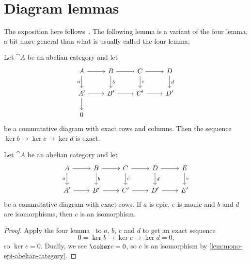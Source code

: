 \section{Diagram lemmas}
\noindent
The exposition here follows~\cite{IversenCohomologyOfSheaves}.
The following lemma is a variant of the four lemma, a bit more general than what is usually called the four lemma:
\begin{lem}\label{lem:four-lemma}
Let \(\cat A\) be an abelian category and let
\begin{equation*}
  \begin{tikzcd}
    A \ar[r] \ar[d, "a"'] & B \ar[r] \ar[d, "b"] & C \ar[r] \ar[d, "c"] & D \ar[d, "d"] \\
    A' \ar[r] \ar[d] & B' \ar[r] & C' \ar[r] & D' \\
    0
  \end{tikzcd}
\end{equation*}
be a commutative diagram with exact rows and columns.
Then the sequence \(\ker b\to\ker c\to\ker d\) is exact.
\end{lem}

\begin{cor}\label{lem:five-lemma}
Let \(\cat A\) be an abelian category and let
\begin{equation*}
  \begin{tikzcd}
    A \ar[r] \ar[d, "a"'] & B \ar[r] \ar[d, "b"] & C \ar[r] \ar[d, "c"] & D \ar[r] \ar[d, "d"] & E \ar[d, "e"] \\
    A' \ar[r] & B' \ar[r] & C' \ar[r] & D' \ar[r] & E'
  \end{tikzcd}
\end{equation*}
be a commutative diagram with exact rows.
If \(a\) is epic, \(e\) is monic and \(b\) and \(d\) are isomorphisms, then \(c\) is an isomorphism.
\end{cor}
\begin{proof}
Apply the four lemma~ to \(a\), \(b\), \(c\) and \(d\) to get an exact sequence
\[0=\ker b\to\ker c\to\ker d=0\text{,} \] so \(\ker c=0\).
Dually, we see \(\coker c=0\), so \(c\) is an isomorphism by \cref{lem:mono-epi-abelian-category}.
\end{proof}

